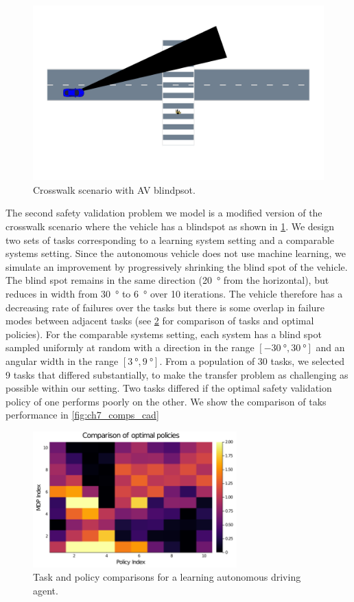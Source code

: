 \begin{figure}
\centering
\includegraphics[trim={0 7cm 10cm 6.5cm},clip, width=0.7\linewidth]{figures/iterative_validation/blindspot.pdf}
\caption{Crosswalk scenario with AV blindpsot. }
\label{fig:av_blindspot}
\end{figure}

The second safety validation problem we model is a modified version of the crosswalk scenario where the vehicle has a blindspot as shown in \cref{fig:av_blindspot}. We design two sets of tasks corresponding to a learning system setting and a comparable systems setting. Since the autonomous vehicle does not use machine learning, we simulate an improvement by progressively shrinking the blind spot of the vehicle. The blind spot remains in the same direction (\SI{20}{\degree} from the horizontal), but reduces in width from \SI{30}{\degree} to \SI{6}{\degree} over \num{10} iterations. The vehicle therefore has a decreasing rate of failures over the tasks but there is some overlap in failure modes between adjacent tasks (see \cref{fig:ch7_comps_lad} for comparison of tasks and optimal policies). For the comparable systems setting, each system has a blind spot sampled uniformly at random with a direction in the range $[\SI{-30}{\degree}, \SI{30}{\degree}]$ and an angular width in the range $[\SI{3}{\degree}, \SI{9}{\degree}]$. From a population of \num{30} tasks, we selected \num{9} tasks that differed substantially, to make the transfer problem as challenging as possible within our setting. Two tasks differed if the optimal safety validation policy of one performs poorly on the other. We show the comparison of taks performance in \cref{fig:ch7_comps_cad}

\begin{figure}
    \centering
    \includegraphics[width=0.7\textwidth]{figures/iterative_validation/blindspot_improving_heatmap.png}
    \caption{Task and policy comparisons for a learning autonomous driving agent.}
    \label{fig:ch7_comps_lad}
\end{figure}


